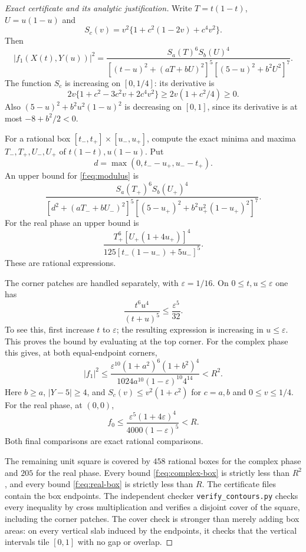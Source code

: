 \documentclass[11pt]{amsart}
\theoremstyle{plain}
\theoremstyle{remark}\newtheorem{remark}[theorem]{Remark}
\numberwithin{equation}{section}
\begin{document}
\begin{proof}[Exact certificate and its analytic justification]
Write $T=t(1-t)$, $U=u(1-u)$ and
\[
 S_c(v)=v^2\{1+c^2(1-2v)+c^4v^2\}.
\]
Then
\begin{equation}\label{f:eq:modulus}
 |f_1(X(t),Y(u))|^2
 =\frac{S_a(T)^6S_b(U)^4}
 {[(t-u)^2+(aT+bU)^2]^5[(5-u)^2+b^2U^2]^7}.
\end{equation}
The function $S_c$ is increasing on $[0,1/4]$: its derivative is
\[
 2v\{1+c^2-3c^2v+2c^4v^2\}\geq2v(1+c^2/4)\geq0.
\]
Also $(5-u)^2+b^2u^2(1-u)^2$ is decreasing on $[0,1]$, since its derivative is at most $-8+b^2/2<0$.

For a rational box $[t_-,t_+]\times[u_-,u_+]$, compute the exact minima and maxima $T_-,T_+,U_-,U_+$ of $t(1-t),u(1-u)$. Put
\[
 d=\max(0,t_--u_+,u_--t_+).
\]
An upper bound for \eqref{f:eq:modulus} is
\begin{equation}\label{f:eq:complex-box}
 \frac{S_a(T_+)^6S_b(U_+)^4}
 {[d^2+(aT_-+bU_-)^2]^5[(5-u_+)^2+b^2u_+^2(1-u_+)^2]^7}.
\end{equation}
For the real phase an upper bound is
\begin{equation}\label{f:eq:real-box}
 \frac{T_+^6[U_+(1+4u_+)]^4}{125[t_-(1-u_-)+5u_-]^5}.
\end{equation}
These are rational expressions.

The corner patches are handled separately, with $\varepsilon=1/16$. On $0\leq t,u\leq\varepsilon$ one has
\[
 \frac{t^6u^4}{(t+u)^5}\leq\frac{\varepsilon^5}{32}.
\]
To see this, first increase $t$ to $\varepsilon$; the resulting expression is increasing in $u\leq\varepsilon$. This proves the bound by evaluating at the top corner.
For the complex phase this gives, at both equal-endpoint corners,
\begin{equation}\label{f:eq:corner-complex}
 |f_1|^2\leq
 \frac{\varepsilon^{10}(1+a^2)^6(1+b^2)^4}
 {1024a^{10}(1-\varepsilon)^{10}4^{14}}<R^2.
\end{equation}
Here $b\geq a$, $|Y-5|\geq4$, and $S_c(v)\leq v^2(1+c^2)$ for $c=a,b$ and $0\leq v\leq1/4$.
For the real phase, at $(0,0)$,
\begin{equation}\label{f:eq:corner-real}
 f_0\leq\frac{\varepsilon^5(1+4\varepsilon)^4}{4000(1-\varepsilon)^5}<R.
\end{equation}
Both final comparisons are exact rational comparisons.

The remaining unit square is covered by $458$ rational boxes for the complex phase and $205$ for the real phase. Every bound \eqref{f:eq:complex-box} is strictly less than $R^2$, and every bound \eqref{f:eq:real-box} is strictly less than $R$. The certificate files contain the box endpoints. The independent checker \texttt{verify\_contours.py} checks every inequality by cross multiplication and verifies a disjoint cover of the square, including the corner patches. The cover check is stronger than merely adding box areas: on every vertical slab induced by the endpoints, it checks that the vertical intervals tile $[0,1]$ with no gap or overlap.
\end{proof}
\end{document}
